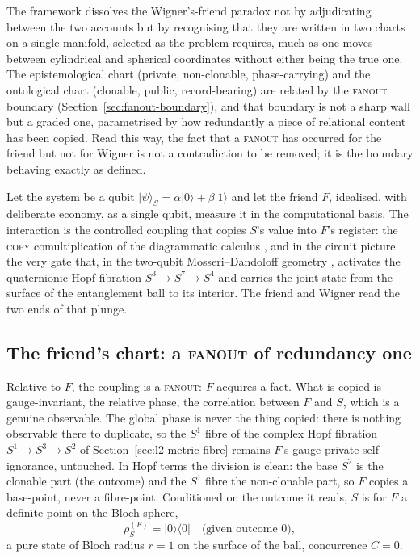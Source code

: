 \documentclass{article}
\begin{document}
The framework dissolves the Wigner's-friend paradox \autocite{wigner_1961} not by
adjudicating between the two accounts but by recognising that they are written in
two charts on a single manifold, selected as the problem requires, much as one
moves between cylindrical and spherical coordinates without either being the true
one. The epistemological chart (private, non-clonable, phase-carrying) and the
ontological chart (clonable, public, record-bearing) are related by the
\textsc{fanout} boundary (Section~\ref{sec:fanout-boundary}), and that boundary
is not a sharp wall but a graded one, parametrised by how redundantly a piece of
relational content has been copied. Read this way, the fact that a \textsc{fanout}
has occurred for the friend but not for Wigner is not a contradiction to be
removed; it is the boundary behaving exactly as defined.

Let the system be a qubit $\lvert\psi\rangle_{S}=\alpha\lvert 0\rangle
+\beta\lvert 1\rangle$ and let the friend $F$, idealised, with deliberate
economy, as a single qubit, measure it in the computational basis. The
interaction is the controlled coupling that copies $S$'s value into $F$'s
register: the \textsc{copy} comultiplication of the diagrammatic calculus
\autocite{CoeckeKissinger2017}, and in the circuit picture the very gate that, in
the two-qubit Mosseri--Dandoloff geometry \autocite{MosseriDandoloff2001},
activates the quaternionic Hopf fibration $S^{3}\to S^{7}\to S^{4}$ and carries
the joint state from the surface of the entanglement ball to its interior. The
friend and Wigner read the two ends of that plunge.
\subsection{The friend's chart: a \textsc{fanout} of redundancy one}
\label{sec:wf-friend}

Relative to $F$, the coupling is a \textsc{fanout}: $F$ acquires a fact. What is
copied is gauge-invariant, the relative phase, the correlation between $F$ and
$S$, which is a genuine observable. The global phase is never the thing copied:
there is nothing observable there to duplicate, so the $S^{1}$ fibre of the
complex Hopf fibration $S^{1}\to S^{3}\to S^{2}$ of
Section~\ref{sec:l2-metric-fibre} remains $F$'s gauge-private self-ignorance,
untouched. In Hopf terms the division is clean: the base $S^{2}$ is the clonable
part (the outcome) and the $S^{1}$ fibre the non-clonable part, so $F$ copies a
base-point, never a fibre-point. Conditioned on the outcome it reads, $S$ is for
$F$ a definite point on the Bloch sphere,
\begin{equation}
  \rho_{S}^{(F)}=\lvert 0\rangle\langle 0\rvert
  \quad\text{(given outcome }0\text{)},
\end{equation}
a pure state of Bloch radius $r=1$ on the surface of the ball, concurrence $C=0$.
\end{document}
